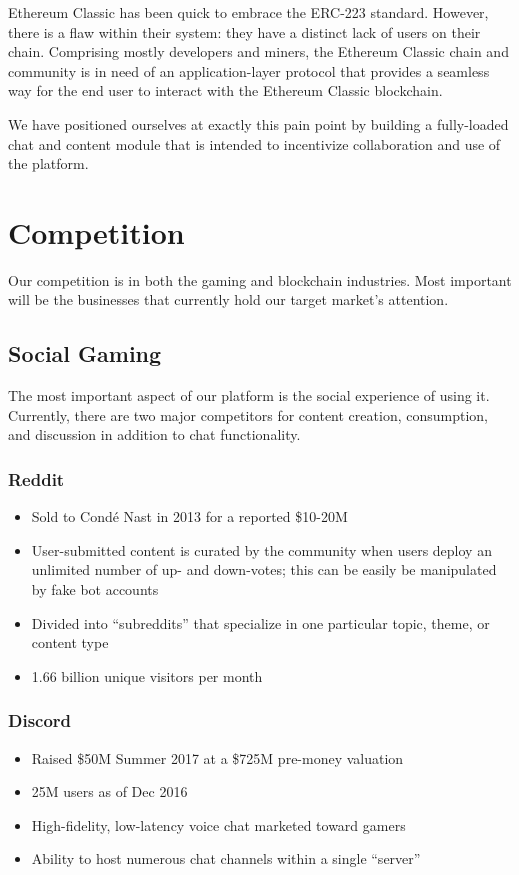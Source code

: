\documentclass[11pt]{report}
\begin{document}
Ethereum Classic has been quick to embrace the ERC-223 standard. However, there is a flaw within their system: they have a distinct lack of users on their chain. Comprising mostly developers and miners, the Ethereum Classic chain and community is in need of an application-layer protocol that provides a seamless way for the end user to interact with the Ethereum Classic blockchain. 

We have positioned ourselves at exactly this pain point by building a fully-loaded chat and content module that is intended to incentivize collaboration and use of the platform. 
\section{Competition}
Our competition is in both the gaming and blockchain industries. Most important will be the businesses that currently hold our target market's attention.
\subsection{Social Gaming}
The most important aspect of our platform is the social experience of using it. Currently, there are two major competitors for content creation, consumption, and discussion in addition to chat functionality.
\subsubsection{Reddit\cite{reddit}}
\begin{itemize}
\item Sold to Condé Nast in 2013 for a reported \$10-20M
\item User-submitted content is curated by the community when users deploy an unlimited number of up- and down-votes; this can be easily be manipulated by fake bot accounts
\item 
Divided into ``subreddits'' that specialize in one particular topic, theme, or content type
\item 1.66 billion unique visitors per month
\end{itemize}
\subsubsection{Discord\cite{discord}}
\begin{itemize}
\item Raised \$50M Summer 2017 at a \$725M pre-money valuation
\item 25M users as of Dec 2016
\item High-fidelity, low-latency voice chat marketed toward gamers
\item Ability to host numerous chat channels within a single ``server''
\end{itemize}
\end{document}
